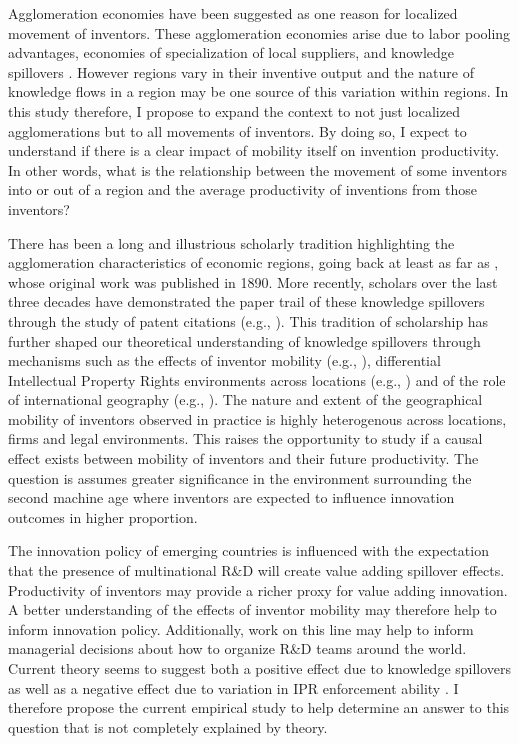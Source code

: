 \documentclass[12pt]{article}
\begin{document}
Agglomeration economies have been suggested as one reason for localized movement of inventors. These agglomeration economies arise due to labor pooling advantages, economies of specialization of local suppliers, and knowledge spillovers \citep{Porter1990, Krugman1991}. However regions vary in their inventive output \citep{Agrawal2014} and the nature of knowledge flows in a region may be one source of this variation within regions. In this study therefore, I propose to expand the context to not just localized agglomerations but to all movements of inventors. By doing so, I expect to understand if there is a clear impact of mobility itself on invention productivity. In other words, what is the relationship between the movement of some inventors into or out of a region and the average productivity of inventions from those inventors?\par

There has been a long and illustrious scholarly tradition highlighting the agglomeration characteristics of economic regions, going back at least as far as \cite{Marshall1890}, whose original work was published in 1890. More recently, scholars over the last three decades have demonstrated the paper trail of these knowledge spillovers through the study of patent citations (e.g., \cite{Jaffe1993, Almeida1999}). This tradition of scholarship has further shaped our theoretical understanding of knowledge spillovers through mechanisms such as the effects of inventor mobility (e.g., \cite{Almeida1999}), differential Intellectual Property Rights environments across locations (e.g., \cite{Zhao2006}) and of the role of international geography (e.g., \cite{Singh2007}).  The nature and extent of the geographical mobility of inventors  observed  in practice is highly heterogenous across locations, firms and legal environments. This raises the opportunity to study if  a causal effect exists between mobility of inventors and their future productivity. The question is assumes greater significance in the environment surrounding the second machine age \citep{Mcafee2014} where inventors are expected to influence innovation outcomes in higher proportion. 

The innovation policy of emerging countries is influenced with the expectation that the presence of multinational R\&D will create value adding spillover effects. Productivity of inventors may  provide a richer proxy for value adding innovation. A better understanding of the effects of inventor mobility may therefore help to inform innovation policy. Additionally, work on this line may help to inform managerial decisions about how to organize R\&D teams around the world. Current theory seems to suggest both a positive effect due to knowledge spillovers \citep{Almeida1999} as well as a negative effect due to variation in IPR enforcement ability \citep{Zhao2006}. I therefore propose  the current empirical study to help determine an  answer to this question that is not completely explained by theory.
\end{document}
